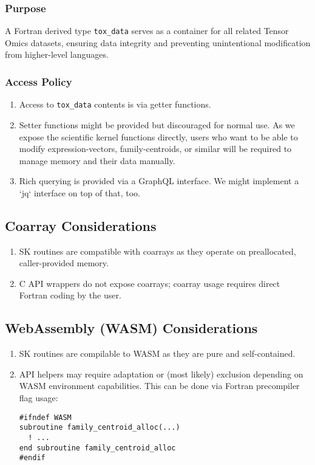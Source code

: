 \documentclass{article}
\begin{document}
\subsubsection{Purpose}
A Fortran derived type \texttt{tox\_data} serves as a container for all related Tensor Omics datasets, ensuring data integrity and preventing unintentional modification from higher-level languages.

\subsubsection{Access Policy}
\begin{enumerate}
  \item Access to \texttt{tox\_data} contents is via getter functions.
  \item Setter functions might be provided but discouraged for normal use. As
    we expose the scientific kernel functions directly, users who want to be
    able to modify expression-vectors, family-centroids, or similar will be
    required to manage memory and their data manually.
  \item Rich querying is provided via a GraphQL interface. We might implement a
    `jq` interface on top of that, too.
\end{enumerate}

\subsection{Coarray Considerations}
\begin{enumerate}
  \item SK routines are compatible with coarrays as they operate on preallocated, caller-provided memory.
  \item C API wrappers do not expose coarrays; coarray usage requires direct Fortran coding by the user.
\end{enumerate}

\subsection{WebAssembly (WASM) Considerations}
\begin{enumerate}
  \item SK routines are compilable to WASM as they are pure and self-contained.
  \item API helpers may require adaptation or (most likely) exclusion depending
    on WASM environment capabilities. This can be done via Fortran precompiler
    flag usage:
\begin{verbatim}
#ifndef WASM
subroutine family_centroid_alloc(...)
  ! ...
end subroutine family_centroid_alloc
#endif
\end{verbatim}
\end{enumerate}
\end{document}
